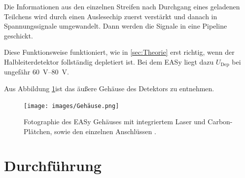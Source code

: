 Die Informationen aus den einzelnen Streifen nach Durchgang eines geladenen
Teilchens wird durch einen Auslesechip zuerst verstärkt und danach in
Spannungssignale umgewandelt. Dann werden die Signale in eine Pipeline geschickt.

Diese Funktionsweise funktioniert, wie in \ref{sec:Theorie} erst richtig, wenn der
Halbleiterdetektor follständig depletiert ist. Bei dem EASy liegt dazu
$U_\text{Dep}$ bei ungefähr \SIrange{60}{80}{\volt}.

Aus Abbildung \ref{fig:Gehäuse}ist das äußere Gehäuse des Detektors zu entnehmen.
\begin{figure}[htb]
  \centering
  \texttt{[image: images/Gehäuse.png]}
  \caption{Fotographie des EASy Gehäuses mit integriertem Laser und Carbon-Plätchen, sowie den einzelnen Anschlüssen \cite{anleitung}.}
  \label{fig:Gehäuse}
\end{figure}


\section{Durchführung}
\label{sec:Durchführung}
